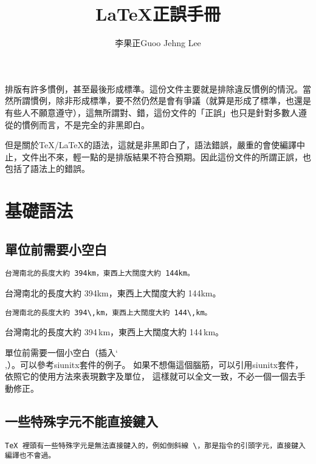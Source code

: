 \documentclass[11pt,a4paper]{article}
\title{\textsf{\textbf{\LaTeX 正誤手冊}}}
\author{李果正Guoo Jehng Lee}
\date{\zhtoday}
\begin{document}
\maketitle

排版有許多慣例，甚至最後形成標準。這份文件主要就是排除違反慣例的情況。當然所謂慣例，除非形成標準，要不然仍然是會有爭議（就算是形成了標準，也還是有些人不願意遵守），這無所謂對、錯，這份文件的「正誤」也只是針對多數人遵從的慣例而言，不是完全的非黑即白。

但是關於\TeX/\LaTeX 的語法，這就是非黑即白了，語法錯誤，嚴重的會使編譯中止，文件出不來，輕一點的是排版結果不符合預期。因此這份文件的所謂正誤，也包括了語法上的錯誤。

\section{基礎語法}

\subsection{單位前需要小空白}

\begin{Wrong}
\begin{verbatim}
台灣南北的長度大約 394km，東西上大闊度大約 144km。
\end{verbatim}
\end{Wrong}

台灣南北的長度大約 394km，東西上大闊度大約 144km。

\begin{Right}
\begin{verbatim}
台灣南北的長度大約 394\,km，東西上大闊度大約 144\,km。
\end{verbatim}
\end{Right}

台灣南北的長度大約 394\,km，東西上大闊度大約 144\,km。

單位前需要一個小空白（插入\char`\\,）。可以參考{\sf siunitx}套件的例子。
如果不想傷這個腦筋，可以引用{\sf siunitx}套件，依照它的使用方法來表現數字及單位，
這樣就可以全文一致，不必一個一個去手動修正。

\subsection{一些特殊字元不能直接鍵入}

\begin{Wrong}
\begin{verbatim}
TeX 裡頭有一些特殊字元是無法直接鍵入的，例如倒斜線 \，那是指令的引頭字元，直接鍵入編譯也不會過。
\end{verbatim}
\end{Wrong}
\end{document}
